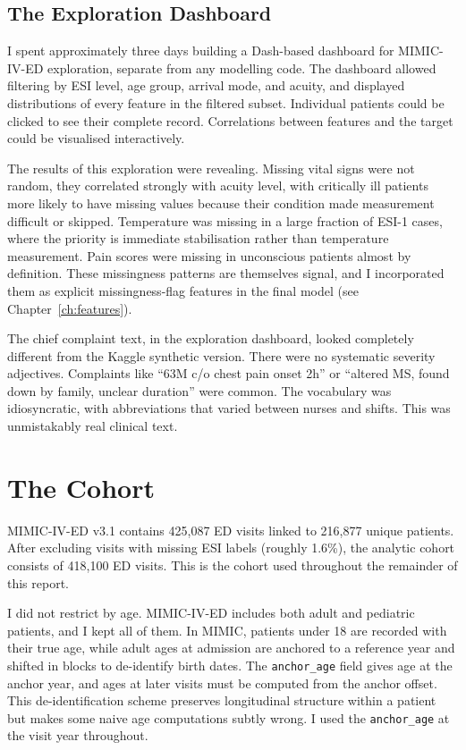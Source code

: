 \subsection*{The Exploration Dashboard}

I spent approximately three days building a Dash-based dashboard for MIMIC-IV-ED exploration, separate from any modelling code. The dashboard allowed filtering by ESI level, age group, arrival mode, and acuity, and displayed distributions of every feature in the filtered subset. Individual patients could be clicked to see their complete record. Correlations between features and the target could be visualised interactively.

The results of this exploration were revealing. Missing vital signs were not random, they correlated strongly with acuity level, with critically ill patients more likely to have missing values because their condition made measurement difficult or skipped. Temperature was missing in a large fraction of ESI-1 cases, where the priority is immediate stabilisation rather than temperature measurement. Pain scores were missing in unconscious patients almost by definition. These missingness patterns are themselves signal, and I incorporated them as explicit missingness-flag features in the final model (see Chapter~\ref{ch:features}).

The chief complaint text, in the exploration dashboard, looked completely different from the Kaggle synthetic version. There were no systematic severity adjectives. Complaints like ``63M c/o chest pain onset 2h'' or ``altered MS, found down by family, unclear duration'' were common. The vocabulary was idiosyncratic, with abbreviations that varied between nurses and shifts. This was unmistakably real clinical text.

\section{The Cohort}

MIMIC-IV-ED v3.1 contains 425,087 ED visits linked to 216,877 unique patients. After excluding visits with missing ESI labels (roughly 1.6\%), the analytic cohort consists of 418,100 ED visits. This is the cohort used throughout the remainder of this report.

I did not restrict by age. MIMIC-IV-ED includes both adult and pediatric patients, and I kept all of them. In MIMIC, patients under 18 are recorded with their true age, while adult ages at admission are anchored to a reference year and shifted in blocks to de-identify birth dates. The \texttt{anchor\_age} field gives age at the anchor year, and ages at later visits must be computed from the anchor offset. This de-identification scheme preserves longitudinal structure within a patient but makes some naive age computations subtly wrong. I used the \texttt{anchor\_age} at the visit year throughout.

